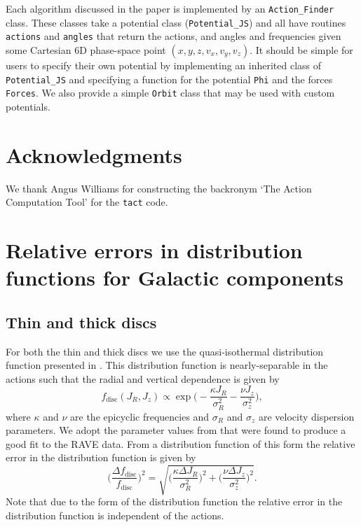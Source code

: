 \documentclass[useAMS,usenatbib,fleqn,a4paper]{mn2e}
\begin{document}
Each algorithm discussed in the paper is implemented by an \texttt{Action\_Finder} class. These classes take a potential class (\texttt{Potential\_JS}) and all have routines \texttt{actions} and \texttt{angles} that return the actions, and angles and frequencies given some Cartesian 6D phase-space point $(x,y,z,v_x,v_y,v_z)$. It should be simple for users to specify their own potential by implementing an inherited class of \texttt{Potential\_JS} and specifying a function for the potential \texttt{Phi} and the forces \texttt{Forces}. We also provide a simple \texttt{Orbit} class that may be used with custom potentials.

\section*{Acknowledgments}
We thank Angus Williams for constructing the backronym `The Action Computation Tool' for the \texttt{tact} code.




\appendix
\section{Relative errors in distribution functions for Galactic components}\label{Appendix}
\subsection{Thin and thick discs}
For both the thin and thick discs we use the quasi-isothermal distribution function presented in \cite{Binney2010}. This distribution function is nearly-separable in the actions such that the radial and vertical dependence is given by
\begin{equation}
f_\mathrm{disc}(J_R,J_z) \propto \exp \Big(-\frac{\kappa J_R}{\sigma_R^2}-\frac{\nu J_z}{\sigma_z^2}\Big),
\end{equation}
where $\kappa$ and $\nu$ are the epicyclic frequencies and $\sigma_R$ and $\sigma_z$ are velocity dispersion parameters. We adopt the parameter values from \cite{Piffl2014} that were found to produce a good fit to the RAVE data. From a distribution function of this form the relative error in the distribution function is given by
\begin{equation}
\Big(\frac{\Delta f_\mathrm{disc}}{f_\mathrm{disc}}\Big)^2 = \sqrt{\Big(\frac{\kappa\Delta J_R}{\sigma_R^2}\Big)^2+\Big(\frac{\nu\Delta J_z}{\sigma_z^2}\Big)^2}.
\end{equation}
Note that due to the form of the distribution function the relative error in the distribution function is independent of the actions.
\end{document}
